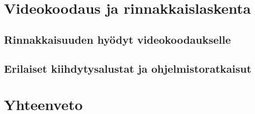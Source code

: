 \newpage

\section{Videokoodaus ja rinnakkaislaskenta}

\subsection{Rinnakkaisuuden hyödyt videokoodaukselle}

\subsection{Erilaiset kiihdytysalustat ja ohjelmistoratkaisut}

\section{Yhteenveto}



